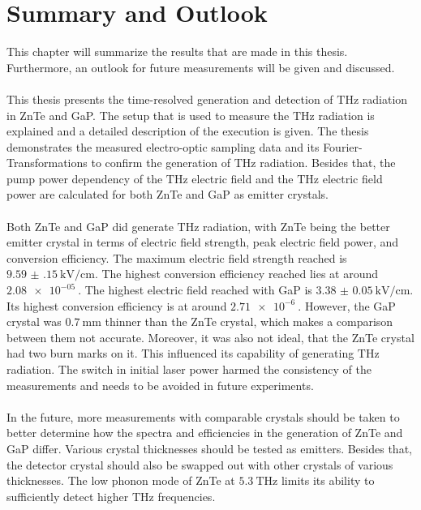 \chapter{Summary and Outlook}
\label{sec:summary}
This chapter will summarize the results that are made in this thesis.
Furthermore, an outlook for future measurements will be given and discussed.
\\\\
This thesis presents the time-resolved generation and detection of $\si{\tera\hertz}$ radiation in ZnTe and GaP.
The setup that is used to measure the $\si{\tera\hertz}$ radiation is explained and a detailed description of the execution is given.
The thesis demonstrates the measured electro-optic sampling data and its Fourier-Transformations to confirm the generation of $\si{\tera\hertz}$ radiation.
Besides that, the pump power dependency of the $\si{\tera\hertz}$ electric field and the $\si{\tera\hertz}$ electric field power are calculated for both ZnTe and GaP as emitter crystals.
\\\\
Both ZnTe and GaP did generate $\si{\tera\hertz}$ radiation, with ZnTe being the better emitter crystal in terms of electric field strength, peak electric field power, and conversion efficiency.
The maximum electric field strength reached is $\SI{9.59(15)}{\kilo\V\per\centi\meter}$.
The highest conversion efficiency reached lies at around $\SI{2.08e-05}{}$.
The highest electric field reached with GaP is $\SI{3.38(5)}{\kilo\V\per\centi\meter}$.
Its highest conversion efficiency is at around $\SI{2.71e-6}{}$.
However, the GaP crystal was $\SI{0.7}{\milli\meter}$ thinner than the ZnTe crystal, which makes a comparison between them not accurate.
Moreover, it was also not ideal, that the ZnTe crystal had two burn marks on it.
This influenced its capability of generating $\si{\tera\hertz}$ radiation.
The switch in initial laser power harmed the consistency of the measurements and needs to be avoided in future experiments.
\\\\
In the future, more measurements with comparable crystals should be taken to better determine how the spectra and efficiencies in the generation of ZnTe and GaP differ.
Various crystal thicknesses should be tested as emitters.
Besides that, the detector crystal should also be swapped out with other crystals of various thicknesses.
The low phonon mode of ZnTe at $\SI{5.3}{\tera\hertz}$ \cite{phonon_modes, phonon_ZnTe} limits its ability to sufficiently detect higher $\si{\tera\hertz}$ frequencies.
